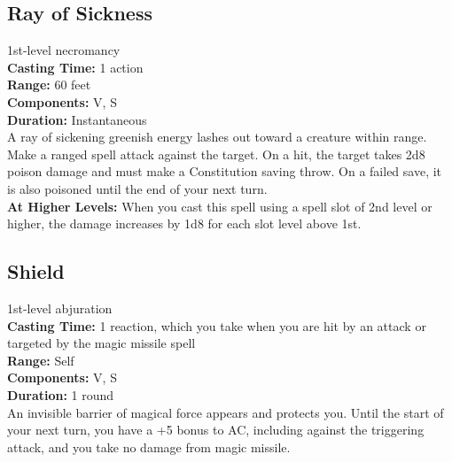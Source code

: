 \documentclass[11pt, A4paper, english]{article}
\begin{document}
		\subsection{Ray of Sickness}
1st-level necromancy \\
\textbf{Casting Time:} 1 action \\
\textbf{Range:} 60 feet \\
\textbf{Components:} V, S \\
\textbf{Duration:} Instantaneous \\
A ray of sickening greenish energy lashes out toward a creature within range. Make a ranged spell attack against the target. On a hit, the target takes 2d8 poison damage and must make a Constitution saving throw. On a failed save, it is also poisoned until the end of your next turn. \\
\textbf{At Higher Levels:} When you cast this spell using a spell slot of 2nd level or higher, the damage increases by 1d8 for each slot level above 1st.

		\subsection{Shield}
1st-level abjuration \\
\textbf{Casting Time:} 1 reaction, which you take when you are hit by an attack or targeted by the magic missile spell \\
\textbf{Range:} Self \\
\textbf{Components:} V, S \\
\textbf{Duration:} 1 round \\
An invisible barrier of magical force appears and protects you. Until the start of your next turn, you have a +5 bonus to AC, including against the triggering attack, and you take no damage from magic missile.
\end{document}
